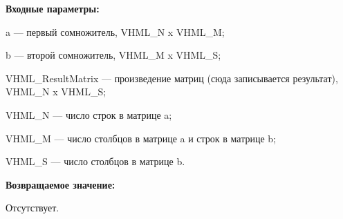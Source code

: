 \textbf{Входные параметры:}

a --- первый сомножитель, VHML\_N x VHML\_M;
 
b --- второй сомножитель, VHML\_M x VHML\_S;
 
VHML\_ResultMatrix --- произведение матриц (сюда записывается результат), VHML\_N x VHML\_S;
 
VHML\_N --- число строк в матрице a;
 
VHML\_M --- число столбцов в матрице a и строк в матрице b;
 
VHML\_S --- число столбцов в матрице b.

\textbf{Возвращаемое значение:}

Отсутствует.